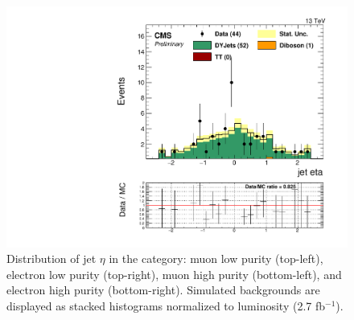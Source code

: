 \begin{figure}[h]
\begin{center}
\includegraphics[scale=0.37]{figures/control/etaZjjEHP.pdf}
\caption[Distribution of jet $\eta$]{Distribution of jet $\eta$ in the category: muon low purity (top-left), electron low purity (top-right), muon high purity (bottom-left), and  electron high purity (bottom-right). Simulated backgrounds are displayed as stacked histograms normalized to luminosity (2.7 fb$^{-1}$).}
\label{etaZjj_VZ}
\end{center}
\end{figure}
